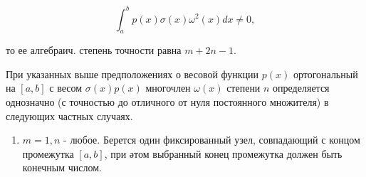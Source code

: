 \documentclass[10pt]{article}
\begin{document}
\[

\int_{a}^{b} p(x) \sigma(x) \omega^{2}(x) d x \neq 0,

\]



то ее алгебраич. степень точности равна $m+2 n-1$.



При указанных выше предположениях о весовой функции $p(x)$ ортогональный на $[a, b]$ с весом $\sigma(x) p(x)$ многочлен $\omega(x)$ степени $n$ определяется однозначно (с точностью до отличного от нуля постоянного множителя) в следующих частных случаях.



\begin{enumerate}

  \item $m=1, n$ - любое. Берется один фиксированный узел, совпадающий с концом промежутка $[a, b]$, при әтом выбранный конец промежутка должен быть конечным числом.

\end{enumerate}
\end{document}
